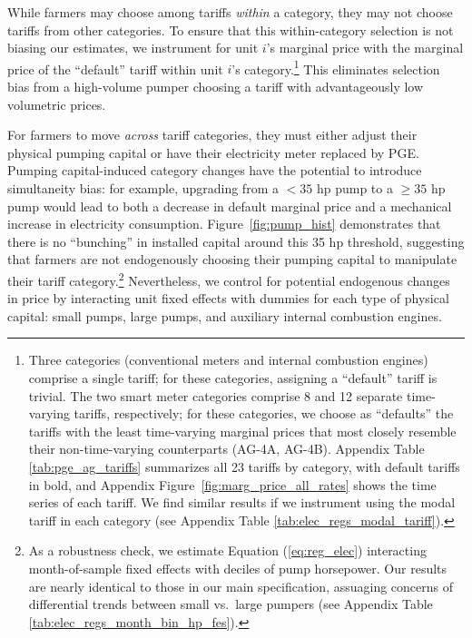 While farmers may choose among tariffs \emph{within} a category, they may not choose tariffs from other categories. To ensure that this within-category selection is not biasing our estimates, we instrument for unit $i$'s marginal price with the marginal price of the ``default'' tariff within unit $i$'s category.\footnote{Three categories (conventional meters and internal combustion engines) comprise a single tariff; for these categories, assigning a ``default'' tariff is trivial. The two smart meter categories comprise 8 and 12 separate time-varying tariffs, respectively; for these categories, we choose as ``defaults'' the tariffs with the least time-varying marginal prices that most closely resemble their non-time-varying counterparts (AG-4A, AG-4B). Appendix Table \ref{tab:pge_ag_tariffs} summarizes all 23 tariffs by category, with default tariffs in bold, and Appendix Figure~\ref{fig:marg_price_all_rates} shows the time series of each tariff. We find similar results if we instrument using the modal tariff in each category (see Appendix Table \ref{tab:elec_regs_modal_tariff}).}
This eliminates selection bias from a high-volume pumper choosing a tariff with advantageously low volumetric prices.

For farmers to move \emph{across} tariff categories, they must either adjust their physical pumping capital or have their electricity meter replaced by PGE. Pumping capital-induced category changes have the potential to introduce simultaneity bias: for example, upgrading from a $<35$ hp pump to a $\ge35$ hp pump would lead to both a decrease in default marginal price and a mechanical increase in electricity consumption. Figure~\ref{fig:pump_hist} demonstrates that there is no ``bunching'' in installed capital around this 35 hp threshold, suggesting that farmers are not endogenously choosing their pumping capital to manipulate their tariff category.\footnote{As a robustness check, we estimate Equation (\ref{eq:reg_elec}) interacting month-of-sample fixed effects with deciles of pump horsepower. Our results are nearly identical to those in our main specification, assuaging concerns of differential trends between small vs.\ large pumpers (see Appendix Table \ref{tab:elec_regs_month_bin_hp_fes}).} Nevertheless, we control for potential endogenous changes in price by interacting unit fixed effects with dummies for each type of physical capital: small pumps, large pumps, and auxiliary internal combustion engines.

